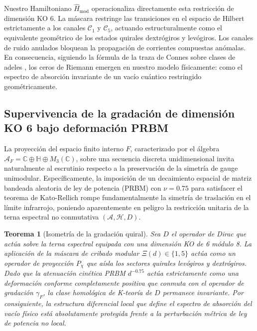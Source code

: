 \documentclass[aps,prl,preprint,superscriptaddress,floatfix]{revtex4-2}
\newtheorem{theorem}{Teorema}[section]
\newcommand{\Hilb}{\mathcal{H}}
\begin{document}
Nuestro Hamiltoniano $\hat{H}_{\text{mod}}$ operacionaliza directamente esta restricción de dimensión KO 6. La máscara restringe las transiciones en el espacio de Hilbert estrictamente a los canales $\mathcal{C}_1$ y $\mathcal{C}_5$, actuando estructuralmente como el equivalente geométrico de los estados quirales dextrógiros y levógiros. Los canales de ruido anulados bloquean la propagación de corrientes compuestas anómalas. En consecuencia, siguiendo la fórmula de la traza de Connes sobre clases de adeles \cite{Connes1999}, los ceros de Riemann emergen en nuestro modelo físicamente: como el espectro de absorción invariante de un vacío cuántico restringido geométricamente.

\subsection{Supervivencia de la gradación de dimensión KO 6 bajo deformación PRBM}

La proyección del espacio finito interno $F$, caracterizado por el álgebra $\mathcal{A}_F = \mathbb{C} \oplus \mathbb{H} \oplus M_3(\mathbb{C})$, sobre una secuencia discreta unidimensional invita naturalmente al escrutinio respecto a la preservación de la simetría de gauge unimodular. Específicamente, la imposición de un decaimiento espacial de matriz bandeada aleatoria de ley de potencia (PRBM) con $\nu = 0.75$ para satisfacer el teorema de Kato-Rellich rompe fundamentalmente la simetría de traslación en el límite infrarrojo, poniendo aparentemente en peligro la restricción unitaria de la terna espectral no conmutativa $(\mathcal{A}, \Hilb, D)$.

\begin{theorem}[Isometría de la gradación quiral]
\label{thm:dirac_isometry}
Sea $D$ el operador de Dirac que actúa sobre la terna espectral equipada con una dimensión KO de 6 módulo 8. La aplicación de la máscara de cribado modular $\Xi(d) \in \{1,5\}$ actúa como un operador de proyección $P_{\chi}$ que aísla los sectores quirales levógiros y dextrógiros. Dado que la atenuación cinética PRBM $d^{-0.75}$ actúa estrictamente como una deformación conforme completamente positiva que conmuta con el operador de gradación $\gamma_F$, la clase homológica de K-teoría de $D$ permanece invariante. Por consiguiente, la estructura diferencial local que define el espectro de absorción del vacío físico está absolutamente protegida frente a la perturbación métrica de ley de potencia no local.
\end{theorem}
\end{document}
